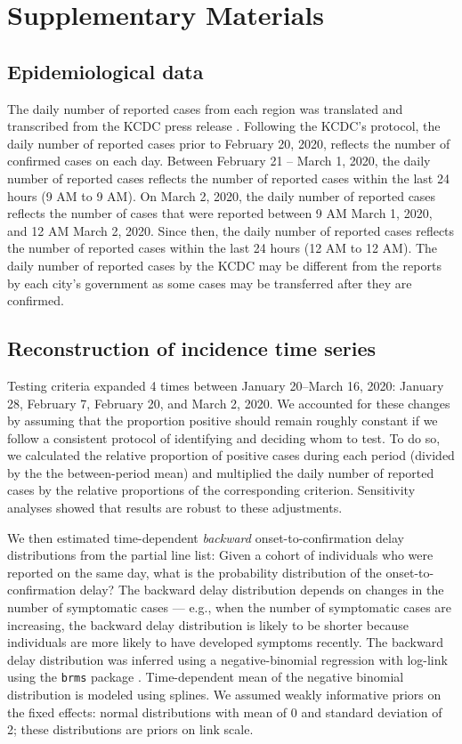 \renewcommand\thefigure{S\arabic{figure}}
\setcounter{figure}{0}    

\section*{Supplementary Materials}

\subsection*{Epidemiological data}

The daily number of reported cases from each region was translated and transcribed from the KCDC press release \citep{kcdc}.
Following the KCDC's protocol, the daily number of reported cases prior to February 20, 2020, reflects the number of confirmed cases on each day.
Between February 21 -- March 1, 2020, the daily number of reported cases reflects the number of reported cases within the last 24 hours (9 AM to 9 AM).
On March 2, 2020, the daily number of reported cases reflects the number of cases that were reported between 9 AM March 1, 2020, and 12 AM March 2, 2020.
Since then, the daily number of reported cases reflects the number of reported cases within the last 24 hours (12 AM to 12 AM).
The daily number of reported cases by the KCDC may be different from the reports by each city's government as some cases may be transferred after they are confirmed.

\subsection*{Reconstruction of incidence time series}

Testing criteria expanded 4 times between January 20--March 16, 2020: January 28, February 7, February 20, and March 2, 2020.
We accounted for these changes by assuming that the proportion positive should remain roughly constant if we follow a consistent protocol of identifying and deciding whom to test.
To do so, we calculated the relative proportion of positive cases during each period (divided by the the between-period mean) and multiplied the daily number of reported cases by the relative proportions of the corresponding criterion.
Sensitivity analyses showed that results are robust to these adjustments.

We then estimated time-dependent \emph{backward} onset-to-confirmation delay distributions from the partial line list: Given a cohort of individuals who were reported on the same day, what is the probability distribution of the onset-to-confirmation delay?
The backward delay distribution depends on changes in the number of symptomatic cases ---
e.g., when the number of symptomatic cases are increasing, the backward delay distribution is likely to be shorter because individuals are more likely to have developed symptoms recently.
The backward delay distribution was inferred using a negative-binomial regression with log-link using the \texttt{brms} package \citep{burkner2017brms}.
Time-dependent mean of the negative binomial distribution is modeled using splines.
We assumed weakly informative priors on the fixed effects: normal distributions with mean of 0 and standard deviation of 2;
these distributions are priors on link scale.

